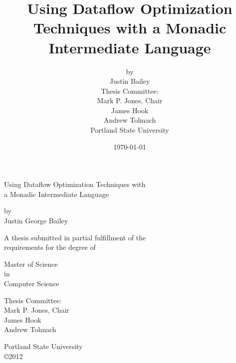 \dodocclass


\thispagestyle{empty}
\date{\today}
\author{by \\ Justin Bailey \\[24pt] 
               {\normalsize Thesis Committee:} \\
               Mark P. Jones, Chair\\
               James Hook\\
               Andrew Tolmach \\[48pt] 
               Portland State University}
\title{Using Dataflow Optimization Techniques with a Monadic Intermediate Language}
\par\begin{centering}\sffamily
Using Dataflow Optimization Techniques with \\
a Monadic Intermediate Language \par\vskip1.5in

by \\
Justin George Bailey\par\vskip1.5in

\begin{singlespace}
A thesis submitted in partial fulfillment of the\\
requirements for the degree of\par\vfill

Master of Science\\
in\\
Computer Science\par\vfill

Thesis Committee:\\
Mark P. Jones, Chair\\
James Hook\\
Andrew Tolmach\par\vfill

Portland State University\\
\copyright2012
\end{singlespace}
\end{centering}
\newpage

\pagestyle{plain}
